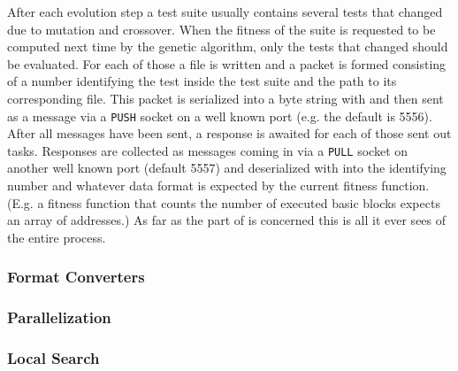 After each evolution step a test suite usually contains several tests that changed due to mutation and
crossover. When the fitness of the suite is requested to be computed next time by the genetic algorithm, 
only the tests that changed should be evaluated. For each of those a file is written and a packet is 
formed consisting of a number identifying the test inside the test suite and the path to its corresponding 
file. This packet is serialized into a byte string with \msgpack and then sent as a \zmq message via a 
\texttt{PUSH} socket on a well known port (e.g. the default is 5556). After all messages have been sent,
a response is awaited for each of those sent out tasks. Responses are collected as \zmq messages coming 
in via a \texttt{PULL} socket on another well known port (default 5557) and deserialized with \msgpack 
into the identifying number and whatever data format is expected by the current fitness function. 
(E.g. a fitness function that counts the number of executed basic blocks expects an array of addresses.)
As far as the \java part of \xmlmate is concerned this is all it ever sees of the entire process.
\subsubsection{Format Converters}
\subsubsection{Parallelization}
\subsubsection{Local Search}
